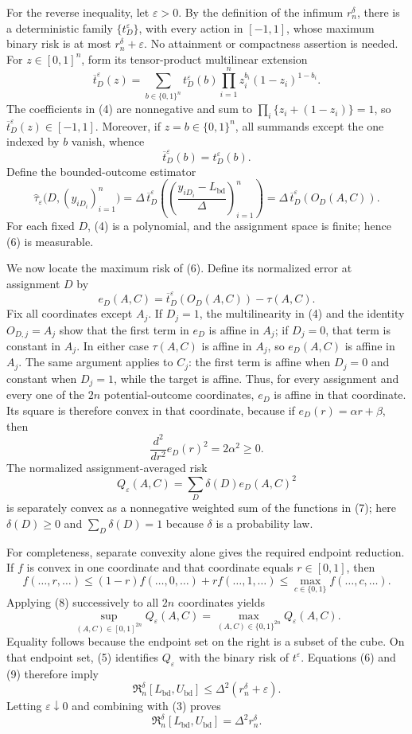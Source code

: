 For the reverse inequality, let \(\varepsilon>0\).  By the definition of the infimum \(r_n^\delta\), there is a deterministic family \(\{t_D^\varepsilon\}\), with every action in \([-1,1]\), whose maximum binary risk is at most \(r_n^\delta+\varepsilon\).  No attainment or compactness assertion is needed.  For \(z\in[0,1]^n\), form its tensor-product multilinear extension
\[
 \overline t_D^\varepsilon(z)
 =\sum_{b\in\{0,1\}^n}t_D^\varepsilon(b)
   \prod_{i=1}^n z_i^{b_i}(1-z_i)^{1-b_i}. \tag{4}
\]
The coefficients in (4) are nonnegative and sum to
\(
 \prod_i\{z_i+(1-z_i)\}=1
\), so \(\overline t_D^\varepsilon(z)\in[-1,1]\).  Moreover, if \(z=b\in\{0,1\}^n\), all summands except the one indexed by \(b\) vanish, whence
\[
 \overline t_D^\varepsilon(b)=t_D^\varepsilon(b). \tag{5}
\]
Define the bounded-outcome estimator
\[
 \widehat\tau_\varepsilon
 \bigl(D,(y_{iD_i})_{i=1}^n\bigr)
 =\Delta\,\overline t_D^\varepsilon
 \left(\left(\frac{y_{iD_i}-L_{\mathrm{bd}}}{\Delta}\right)_{i=1}^n\right)
 =\Delta\,\overline t_D^\varepsilon(O_D(A,C)). \tag{6}
\]
For each fixed \(D\), (4) is a polynomial, and the assignment space is finite; hence (6) is measurable.

We now locate the maximum risk of (6).  Define its normalized error at assignment \(D\) by
\[
 e_D(A,C)=\overline t_D^\varepsilon(O_D(A,C))-\tau(A,C).
\]
Fix all coordinates except \(A_j\).  If \(D_j=1\), the multilinearity in (4) and the identity \(O_{D,j}=A_j\) show that the first term in \(e_D\) is affine in \(A_j\); if \(D_j=0\), that term is constant in \(A_j\).  In either case \(\tau(A,C)\) is affine in \(A_j\), so \(e_D(A,C)\) is affine in \(A_j\).  The same argument applies to \(C_j\): the first term is affine when \(D_j=0\) and constant when \(D_j=1\), while the target is affine.  Thus, for every assignment and every one of the \(2n\) potential-outcome coordinates, \(e_D\) is affine in that coordinate.  Its square is therefore convex in that coordinate, because if \(e_D(r)=\alpha r+\beta\), then
\[
 \frac{d^2}{dr^2}e_D(r)^2=2\alpha^2\geq0. \tag{7}
\]
The normalized assignment-averaged risk
\[
 Q_\varepsilon(A,C)=\sum_D\delta(D)e_D(A,C)^2
\]
is separately convex as a nonnegative weighted sum of the functions in (7); here \(\delta(D)\geq0\) and \(\sum_D\delta(D)=1\) because \(\delta\) is a probability law.

For completeness, separate convexity alone gives the required endpoint reduction.  If \(f\) is convex in one coordinate and that coordinate equals \(r\in[0,1]\), then
\[
 f(\ldots,r,\ldots)
 \leq(1-r)f(\ldots,0,\ldots)+r f(\ldots,1,\ldots)
 \leq\max_{c\in\{0,1\}}f(\ldots,c,\ldots). \tag{8}
\]
Applying (8) successively to all \(2n\) coordinates yields
\[
 \sup_{(A,C)\in[0,1]^{2n}}Q_\varepsilon(A,C)
 =\max_{(A,C)\in\{0,1\}^{2n}}Q_\varepsilon(A,C). \tag{9}
\]
Equality follows because the endpoint set on the right is a subset of the cube.  On that endpoint set, (5) identifies \(Q_\varepsilon\) with the binary risk of \(t^\varepsilon\).  Equations (6) and (9) therefore imply
\[
 \mathfrak R_n^\delta[L_{\mathrm{bd}},U_{\mathrm{bd}}]
 \leq\Delta^2(r_n^\delta+\varepsilon).
\]
Letting \(\varepsilon\downarrow0\) and combining with (3) proves
\[
 \mathfrak R_n^\delta[L_{\mathrm{bd}},U_{\mathrm{bd}}]
 =\Delta^2r_n^\delta. \tag{10}
\]

